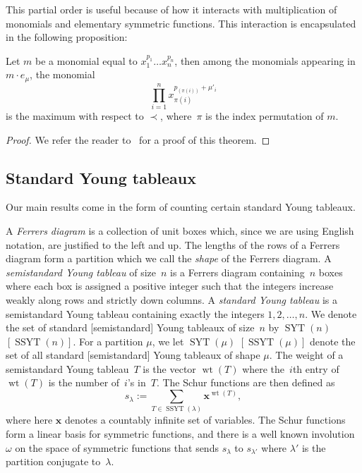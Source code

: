 \documentclass[10pt]{article}
\newcommand{\coloneqq}{:=}
\newcommand{\wt}{\operatorname{wt}}\newcommand{\SYT}{\operatorname{SYT}}\newcommand{\SSYT}{\operatorname{SSYT}}
\begin{document}
This partial order is useful because of how it interacts with multiplication of monomials and elementary symmetric functions. 
This interaction is encapsulated in the following proposition:

\begin{prop}

\label{Order}

Let $m$ be a monomial equal to $x_1^{p_1}\ldots x_n^{p_n}$, then
among the monomials appearing in $m\cdot e_{\mu}$, the monomial 
\begin{equation}
\prod_{i=1}^n x_{\pi(i)}^{p_{(\pi(i))}+\mu'_i}
\end{equation}
 is the maximum with respect to $\prec$, where~$\pi$ is the index permutation of $m$.
	\begin{proof}
	We refer the reader to~\cite{ABR} for a proof of this theorem.
	\end{proof}


\end{prop}


\subsection{Standard Young tableaux}

	Our main results come in the form of counting certain standard Young tableaux.

A \emph{Ferrers diagram} is a collection of unit boxes which, since we are using English notation, are justified to the left 
and up. The lengths of the rows of a Ferrers diagram form a partition which we call the \emph{shape} of the Ferrers diagram. 
A \emph{semistandard Young tableau} of size~$n$ is a Ferrers diagram containing~$n$ boxes where each box is assigned a 
positive integer such that the integers increase weakly along rows and strictly down columns. A \emph{standard Young tableau} 
is a semistandard Young tableau containing exactly the integers $1,2,\ldots, n$. We denote the set of standard [semistandard] 
Young tableaux of size~$n$ by $\SYT (n)$ $[\SSYT(n)]$. For a partition $\mu$, we let $\SYT (\mu)$ $[\SSYT(\mu)]$ denote the set of all 
standard [semistandard] Young tableaux of shape $\mu$. The weight of a semistandard Young tableau~$T$ is the vector $\wt (T)$ 
where the~$i$th entry of $\wt (T)$ is the number of~$i$'s in~$T$. The Schur functions are then defined as 
\begin{equation}
s_\lambda\coloneqq \sum_{T\in \SSYT(\lambda)} \mathbf{x}^{\wt (T)},
\end{equation}
 where here $\mathbf{x}$ denotes a countably infinite set of variables.
The Schur functions form a linear basis for symmetric functions, and there is a well known involution $\omega$ on the space of 
symmetric functions that sends $s_\lambda$ to $s_{\lambda'}$ where $\lambda'$ is the partition conjugate to~$\lambda$.
\end{document}
